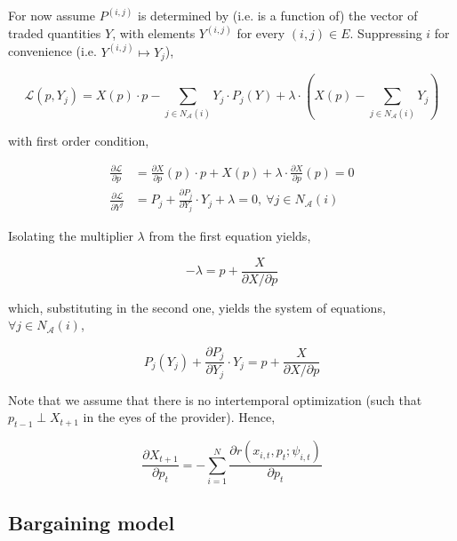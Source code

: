 \documentclass[american]{scrartcl}
\begin{document}
For now assume $P^{(i, j)}$ is determined by (i.e. is a function of) the vector of traded quantities $Y$, with elements $Y^{(i, j)}$ for every $(i, j) \in E$. Suppressing $i$ for convenience (i.e. $Y^{(i, j)} \mapsto Y_j$),

\begin{equation}
	\mathcal{L}\left(p, Y_j\right) = X(p) \cdot p - \sum_{j \in N_{\mathcal{A}}(i)} Y_j \cdot P_j (Y) + \lambda\cdot \left(X(p) - \sum_{j \in N_{\mathcal{A}}(i)} Y_j\right)
\end{equation}

with first order condition,

\begin{equation}
	\begin{split}
		\frac{\partial \mathcal{L}}{\partial p}  &= \frac{\partial X}{\partial p}(p) \cdot p + X(p) + \lambda \cdot \frac{\partial X}{\partial p}(p) = 0 \\
		\frac{\partial \mathcal{L}}{\partial Y^j}  &= P_j + \frac{\partial P_j}{\partial Y_j} \cdot Y_j + \lambda =0, \ \forall j \in N_{\mathcal{A}}(i)
	\end{split}
\end{equation}

Isolating the multiplier $\lambda$ from the first equation yields,

\begin{equation}
	- \lambda = p + \frac{X}{\partial X / \partial p}
\end{equation}

which, substituting in the second one, yields the system of equations, $\forall j \in N_{\mathcal{A}}(i)$,

\begin{equation} \label{firm_optimization}
	P_j(Y_j) + \frac{\partial P_j}{\partial Y_j} \cdot Y_j = p + \frac{X}{\partial X / \partial p}
\end{equation}

Note that we assume that there is no intertemporal optimization (such that $p_{t-1} \perp X_{t+1}$ in the eyes of the provider). Hence,

\begin{equation}
	\frac{\partial X_{t+1}}{\partial p_t} = - \sum^N_{i = 1} \frac{\partial r(x_{i, t}, p_t; \psi_{i, t} )}{\partial p_t}
\end{equation}

\subsection{Bargaining model}
\end{document}
